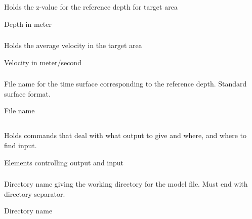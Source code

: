 \subsubsection{} 
 \slist
   \item \Description Holds the z-value for the reference depth for target area
   \item \Argument Depth in meter
   \item \Default
\elist

\subsubsection{} 
 \slist
   \item \Description Holds the average velocity in the target area
   \item \Argument Velocity in meter/second
   \item \Default
\elist

\subsubsection{} 
 \slist
   \item \Description File name for the time surface corresponding to the reference depth. Standard surface format.
   \item \Argument File name
   \item \Default
\elist

\subsection{} 
 \slist
   \item \Description Holds commands that deal with what output to give and where, and where to find input.
   \item \Argument Elements controlling output and input
   \item \Default
 \elist

\subsubsection{} 
 \slist
   \item \Description Directory name giving the working directory for the model file. Must end with directory separator.
   \item \Argument Directory name
   \item \Default
 \elist

